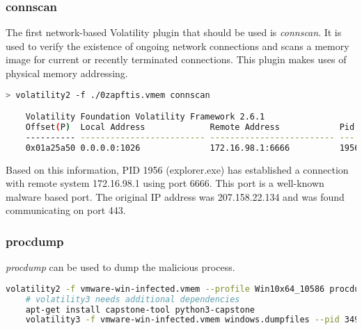 \subsubsection{connscan}
The first network-based Volatility plugin that should be used is \textit{connscan}. It is used to verify the existence of ongoing network connections and scans a memory image for current or recently terminated connections. This plugin makes uses of physical memory addressing.

\begin{lstlisting}[language=bash]
    > volatility2 -f ./0zapftis.vmem connscan

    Volatility Foundation Volatility Framework 2.6.1
    Offset(P)  Local Address             Remote Address            Pid
    ---------- ------------------------- ------------------------- ---
    0x01a25a50 0.0.0.0:1026              172.16.98.1:6666          1956
\end{lstlisting}

Based on this information, PID 1956 (explorer.exe) has established a connection with remote system 172.16.98.1 using port 6666. This port is a well-known malware based port. The original IP address was 207.158.22.134 and was found communicating on port 443.

\newpage

\subsubsection{procdump}
\textit{procdump} can be used to dump the malicious process.

\begin{lstlisting}[language=bash]
    volatility2 -f vmware-win-infected.vmem --profile Win10x64_10586 procdump --pid 3496 --dump-dir .
    # volatility3 needs additional dependencies
    apt-get install capstone-tool python3-capstone
    volatility3 -f vmware-win-infected.vmem windows.dumpfiles --pid 3496
\end{lstlisting}
